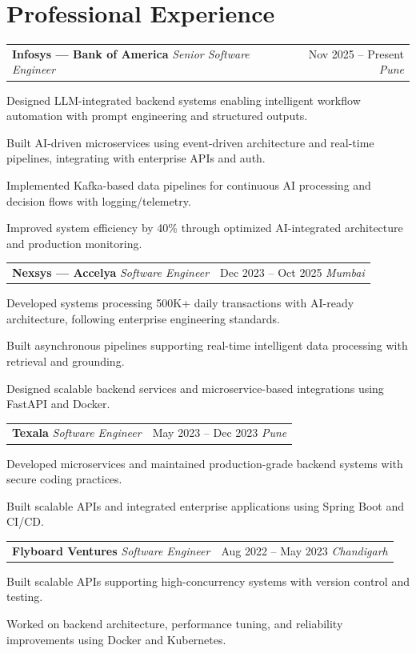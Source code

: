 \documentclass[10pt, letterpaper]{article}
\makeatletter
\newcommand{\resumeitem}[1]{\item\small{#1}}
\newcommand{\jobheading}[4]{%
  \noindent
  \begin{tabularx}{\textwidth}{@{}X r@{}}
    \textbf{\color{primary}#1} \textbar{} \textit{\small\color{subtle}#2} &
    \small\color{subtle}#3 \textbar{} \textit{\small #4}
  \end{tabularx}%
}
\makeatother
\begin{document}
\section{Professional Experience}

\jobheading{Infosys --- Bank of America}{Senior Software Engineer}{Nov 2025 -- Present}{Pune}

\begin{jobitems}
\resumeitem{Designed LLM-integrated backend systems enabling intelligent workflow automation with prompt engineering and structured outputs.}
\resumeitem{Built AI-driven microservices using event-driven architecture and real-time pipelines, integrating with enterprise APIs and auth.}
\resumeitem{Implemented Kafka-based data pipelines for continuous AI processing and decision flows with logging/telemetry.}
\resumeitem{Improved system efficiency by 40\% through optimized AI-integrated architecture and production monitoring.}
\end{jobitems}

\jobheading{Nexsys --- Accelya}{Software Engineer}{Dec 2023 -- Oct 2025}{Mumbai}

\begin{jobitems}
\resumeitem{Developed systems processing 500K+ daily transactions with AI-ready architecture, following enterprise engineering standards.}
\resumeitem{Built asynchronous pipelines supporting real-time intelligent data processing with retrieval and grounding.}
\resumeitem{Designed scalable backend services and microservice-based integrations using FastAPI and Docker.}
\end{jobitems}

\jobheading{Texala}{Software Engineer}{May 2023 -- Dec 2023}{Pune}

\begin{jobitems}
\resumeitem{Developed microservices and maintained production-grade backend systems with secure coding practices.}
\resumeitem{Built scalable APIs and integrated enterprise applications using Spring Boot and CI/CD.}
\end{jobitems}

\jobheading{Flyboard Ventures}{Software Engineer}{Aug 2022 -- May 2023}{Chandigarh}

\begin{jobitems}
\resumeitem{Built scalable APIs supporting high-concurrency systems with version control and testing.}
\resumeitem{Worked on backend architecture, performance tuning, and reliability improvements using Docker and Kubernetes.}
\end{jobitems}
\end{document}
